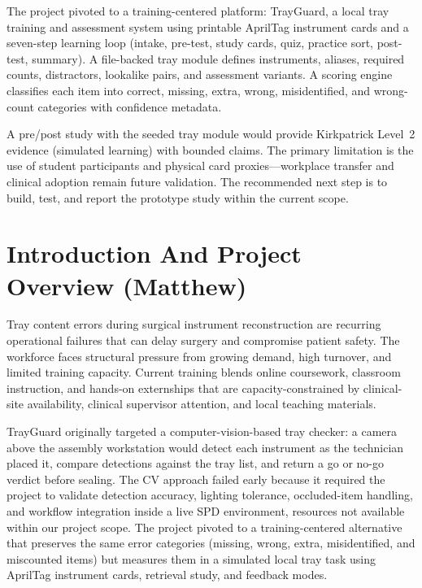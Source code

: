 \documentclass[10pt,a4paper]{article}
\begin{document}
The project pivoted to a training-centered platform: TrayGuard, a local
tray training and assessment system using printable AprilTag instrument cards
and a seven-step learning loop (intake, pre-test, study cards, quiz, practice
sort, post-test, summary). A file-backed tray module defines instruments,
aliases, required counts, distractors, lookalike pairs, and assessment variants.
A scoring engine classifies each item into correct, missing, extra, wrong,
misidentified, and wrong-count categories with confidence metadata.

A pre/post study with the seeded tray module would provide Kirkpatrick Level~2
evidence (simulated learning) with bounded claims. The primary limitation is
the use of student participants and physical card proxies---workplace transfer
and clinical adoption remain future validation. The recommended next step is
to build, test, and report the prototype study within the current scope.





\section{Introduction And Project Overview \hfill {\normalfont\small (Matthew)}}
\label{sec:introduction-and-project-overview}
Tray content errors during surgical instrument reconstruction are recurring
operational failures that can delay surgery and compromise patient safety. The
workforce faces structural pressure from growing demand, high turnover, and
limited training capacity. Current training blends online coursework,
classroom instruction, and hands-on externships that are capacity-constrained by
clinical-site availability, clinical supervisor attention, and local
teaching materials.

TrayGuard originally targeted a computer-vision-based tray checker: a camera
above the assembly workstation would detect each instrument as the technician
placed it, compare detections against the tray list, and return a go or no-go
verdict before sealing. The CV approach failed early because it required the
project to validate detection accuracy, lighting tolerance, occluded-item
handling, and workflow integration inside a live SPD environment, resources
not available within our project scope. The project pivoted to a training-centered
alternative that preserves the same error categories (missing, wrong, extra,
misidentified, and miscounted items) but measures them in a simulated local tray
task using AprilTag instrument cards, retrieval study, and feedback modes.
\end{document}

